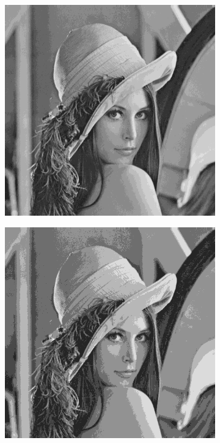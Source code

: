 \documentclass{article}
\begin{document}
\begin{figure}
\begin{subfigure}[c]{0.3\textwidth}
        \end{subfigure}
        \hfill
        \begin{subfigure}[c]{0.3\textwidth}
            \includegraphics[width=\textwidth]{images/lena-y_16.png}
        \end{subfigure}
        \hfill
        \begin{subfigure}[c]{0.3\textwidth}
            \includegraphics[width=\textwidth]{images/lena-y_8.png}

\end{subfigure}
\end{figure}
\end{document}
